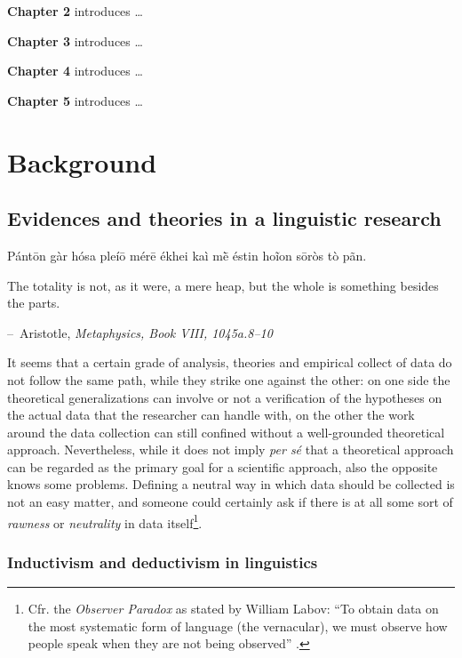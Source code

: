 \documentclass[
  a4paper,
  twoside,
  12pt,
  chapterprefix=false,
  bibliography=totocnumbered,
  listof=flat]{scrbook}
\makeatletter
\newenvironment{chapquote}[2][2em]
  {\setlength{\@tempdima}{#1}%
   \def\chapquote@author{#2}%
   \parshape 1 \@tempdima \dimexpr\textwidth-2\@tempdima\relax%
   \itshape}
  {\par\normalfont\hfill--\ \chapquote@author\hspace*{\@tempdima}\par\vspace{4em}}
\makeatother
\begin{document}
\textbf{Chapter 2} introduces \ldots{}

\textbf{Chapter 3} introduces \ldots{}

\textbf{Chapter 4} introduces \ldots{}

\textbf{Chapter 5} introduces \ldots{}

\part{Background}\label{part-bg}

\hypertarget{evidences-and-theories-in-a-linguistic-research}{%
\chapter{Evidences and theories in a linguistic research}\label{evidences-and-theories-in-a-linguistic-research}}

\begin{chapquote}{Aristotle, \textit{Metaphysics, Book VIII, 1045a.8–10}}
\par{Pántōn gàr hósa pleíō mérē ékhei kaì mḕ éstin hoĩon sōròs tò pãn.}\\ 
\par{\noindent The totality is not, as it were, a mere heap, but the whole is something besides the parts.}
\end{chapquote}

\noindent It seems that a certain grade of analysis, theories and empirical collect of data do not follow the same path, while they strike one against the other: on one side the theoretical generalizations can involve or not a verification of the hypotheses on the actual data that the researcher can handle with, on the other the work around the data collection can still confined without a well-grounded theoretical approach.
Nevertheless, while it does not imply \emph{per sé} that a theoretical approach can be regarded as the primary goal for a scientific approach, also the opposite knows some problems. Defining a neutral way in which data should be collected is not an easy matter, and someone could certainly ask if there is at all some sort of \emph{rawness} or \emph{neutrality} in data itself\footnote{Cfr. the \emph{Observer Paradox} as stated by William Labov: ``To obtain data on the most systematic form of language (the vernacular), we must observe how people speak when they are not being observed'' \citep[xvii]{labov1973}.}.

\hypertarget{inductivism-and-deductivism-in-linguistics}{%
\section{Inductivism and deductivism in linguistics}\label{inductivism-and-deductivism-in-linguistics}}
\end{document}
